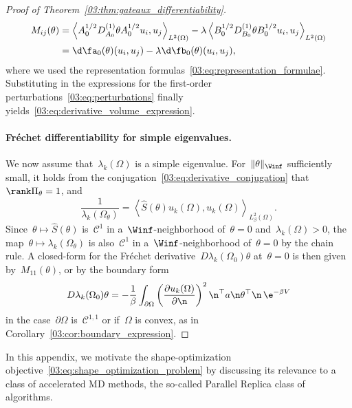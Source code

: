 \begin{proof}[Proof of Theorem~\ref{03:thm:gateaux_differentiability}]
    \begin{equation}
        \begin{aligned}
            M_{ij}(\theta) &= \left\langle A_0^{1/2}D_{A_0}^{(1)}\theta A_0^{1/2} u_i,u_j\right\rangle_{L^2(\Omega)} - \lambda\left\langle B_0^{1/2}D_{B_0}^{(1)}\theta B_0^{1/2} u_i,u_j\right\rangle_{L^2(\Omega)}\\
            &= \d \fa_0(\theta)(u_i,u_j) - \lambda\d \fb_0(\theta)(u_i,u_j),
        \end{aligned}
    \end{equation}
    where we used the representation formulas~\eqref{03:eq:representation_formulae}. Substituting in the expressions for the first-order perturbations~\eqref{03:eq:perturbations} finally yields~\eqref{03:eq:derivative_volume_expression}.
    \paragraph{Fréchet differentiability for simple eigenvalues.}
    We now assume that~$\lambda_k(\Omega)$ is a simple eigenvalue.
    For~$\|\theta\|_{\Winf}$ sufficiently small, it holds from the conjugation~\eqref{03:eq:derivative_conjugation} that~$\rank\Pi_\theta=1$, and
    \begin{equation}
        \frac1{\lambda_k(\Omega_\theta)} = \left\langle \widehat{S}(\theta)u_k(\Omega),u_k(\Omega)\right\rangle_{L^2_\beta(\Omega)}.
    \end{equation}
    Since~$\theta\mapsto \widehat{S}(\theta)$ is~$\mathcal C^1$ in a~$\Winf$-neighborhood of~$\theta=0$ and~$\lambda_k(\Omega)>0$, the map~$\theta\mapsto\lambda_k(\Omega_\theta)$ is also~$\mathcal C^1$ in a~$\Winf$-neighborhood of~$\theta=0$ by the chain rule.
    A closed-form for the Fréchet derivative~$D\lambda_k(\Omega_0)\theta$ at~$\theta=0$ is then given by~$M_{11}(\theta)$, or by the boundary form
    \begin{equation}
        D\lambda_k(\Omega_0)\theta = -\frac1\beta\int_{\partial\Omega} \left(\frac{\partial u_k(\Omega)}{\partial\n}\right)^2\n^\top a \n \theta^\top \n\,\e^{-\beta V}
    \end{equation}
    in the case~$\partial\Omega$ is~$\mathcal C^{1,1}$ or if~$\Omega$ is convex, as in Corollary~\ref{03:cor:boundary_expression}.
\end{proof}

\label{03:sec:parrep}

In this appendix, we motivate the shape-optimization objective~\ref{03:eq:shape_optimization_problem} by discussing its relevance to a class of accelerated MD methods, the so-called Parallel Replica class of algorithms.

